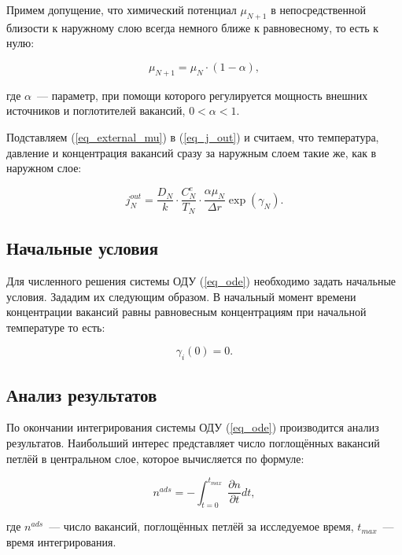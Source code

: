 \documentclass[12pt, a4paper]{article}
\begin{document}
Примем допущение, что химический потенциал $\mu_{N+1}$ в непосредственной близости к наружному слою всегда немного ближе к равновесному, то есть к нулю:

\begin{equation}
\label{eq_external_mu}
\mu_{N+1} = \mu_N \cdot (1 - \alpha),
\end{equation}

\noindent где $\alpha$~--- параметр, при помощи которого регулируется мощность внешних источников и поглотителей вакансий, $0 < \alpha < 1$.

Подставляем (\ref{eq_external_mu}) в (\ref{eq_j_out}) и считаем, что температура, давление и концентрация вакансий сразу за наружным слоем такие же, как в наружном слое:

\begin{equation}
j_N^{out}=\frac{D_N}{k} \cdot \frac{C^e_N}{T_N} \cdot \frac{\alpha \mu_N }{\Delta r} \exp(\gamma_N).\end{equation}

\subsection{Начальные условия}

Для численного решения системы ОДУ (\ref{eq_ode}) необходимо задать начальные условия. Зададим их следующим образом. В начальный момент времени концентрации вакансий равны равновесным концентрациям при начальной температуре то есть:

\begin{equation}
\label{eq_bc1}
\gamma_i(0) = 0.
\end{equation}

\subsection{Анализ результатов}

По окончании интегрирования системы ОДУ (\ref{eq_ode}) производится анализ результатов. Наибольший интерес представляет число поглощённых вакансий петлёй в центральном слое, которое вычисляется по формуле:

\begin{equation}
n^{ads} = -\int_{t = 0}^{t_{max}} \frac{\partial n}{\partial t} dt,
\end{equation}

\noindent где $n^{ads}$~--- число вакансий, поглощённых петлёй за исследуемое время, $t_{max}$~--- время интегрирования.
\end{document}
